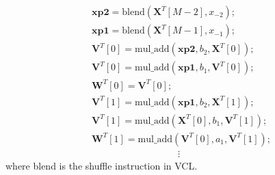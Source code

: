 \begin{equation}
    \label{eq:mix_fir_zic}
    \begin{aligned}
        & \bm{xp2} = \text{blend}(\bm{X}^T[M{-}2],x_{-2}); \\
        & \bm{xp1} = \text{blend}(\bm{X}^T[M{-}1],x_{-1}); \\
        & \bm{V}^T[0] = \text{mul\_add}(\bm{xp2},b_2,\bm{X}^T[0]); \\
        & \bm{V}^T[0] = \text{mul\_add}(\bm{xp1},b_1,\bm{V}^T[0]); \\
        & \bm{W}^T[0] = \bm{V}^T[0]; \\
        & \bm{V}^T[1] = \text{mul\_add}(\bm{xp1},b_2,\bm{X}^T[1]); \\
        & \bm{V}^T[1] = \text{mul\_add}(\bm{X}^T[0],b_1,\bm{V}^T[1]); \\
        & \bm{W}^T[1] = \text{mul\_add}(\bm{V}^T[0],a_1,\bm{V}^T[1]); \\
        & \quad\quad\quad\quad\quad\quad\quad\quad\quad \vdots
    \end{aligned}
\end{equation}
where blend is the shuffle instruction in VCL. 
